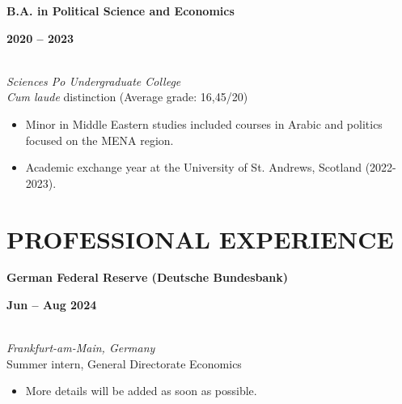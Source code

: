 \documentclass[a4paper,9pt]{extarticle}
\begin{document}
\noindent
\begin{minipage}[t]{0.7\textwidth}
  \textbf{B.A. in Political Science and Economics}
\end{minipage}%
\begin{minipage}[t]{0.3\textwidth}
  \raggedleft \textbf{2020 -- 2023}
\end{minipage}
\\
\textit{Sciences Po Undergraduate College} \\
\textit{Cum laude} distinction (Average grade: 16,45/20)
\begin{itemize}[noitemsep, topsep=0pt, left=0.65cm]
    \item Minor in Middle Eastern studies included courses in Arabic and politics focused on the MENA region. 
    \item Academic exchange year at the University of St. Andrews, Scotland (2022-2023). \\
\end{itemize} 


\section*{PROFESSIONAL EXPERIENCE}

\noindent
\newline
\begin{minipage}[t]{0.7\textwidth}
  \textbf{German Federal Reserve (Deutsche Bundesbank)}
\end{minipage}%
\begin{minipage}[t]{0.3\textwidth}
  \raggedleft \textbf{Jun -- Aug 2024}
\end{minipage}
\\
\textit{Frankfurt-am-Main, Germany} \\ 
Summer intern, General Directorate Economics 
\begin{itemize}[noitemsep, topsep=0pt, left=0.65cm]
    \item More details will be added as soon as possible. \\
\end{itemize}
\end{document}
